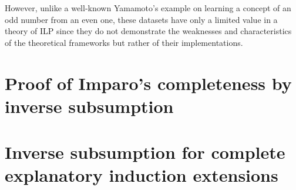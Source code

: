However, unlike a well-known Yamamoto's example \cite{yamamoto1997hypotheses} on learning a concept of an odd number from an even one, these datasets have only a limited value in a theory of ILP since they do not demonstrate the weaknesses and characteristics of the theoretical frameworks but rather of their implementations. 

\section{Proof of Imparo's completeness by inverse subsumption}
\section{Inverse subsumption for complete explanatory induction extensions}